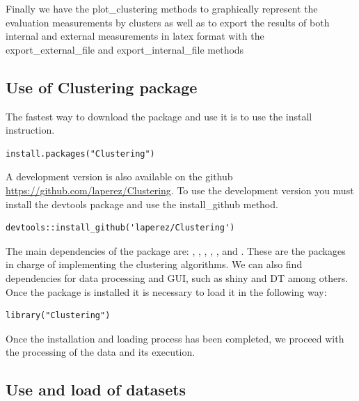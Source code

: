 Finally we have the plot\_clustering methods to graphically represent the evaluation measurements by clusters as well as to export the results of both internal and external measurements in latex format with the export\_external\_file and export\_internal\_file methods

\subsection{Use of Clustering package}

The fastest way to download the  package and use it is to use the install instruction.

\begin{verbatim}
install.packages("Clustering")
\end{verbatim}

A development version is also available on the github \url{https://github.com/laperez/Clustering}. To use the development version you must install the devtools package and use the install\_github method.

\begin{verbatim}
devtools::install_github('laperez/Clustering')
\end{verbatim}

The main dependencies of the   package are: , , , , ,  and . These are the packages in charge of implementing the clustering algorithms. We can also find dependencies for data processing and GUI, such as shiny and DT among others. Once the package is installed it is necessary to load it in the following way:

\begin{verbatim}
library("Clustering")
\end{verbatim}

Once the installation and loading process has been completed, we proceed with the processing of the data and its execution.

\subsection*{Use and load of datasets}

